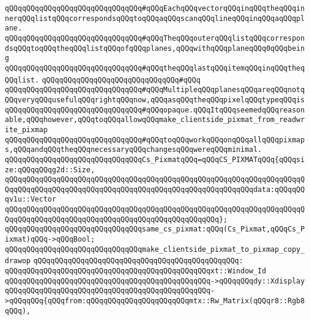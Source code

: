\verb|qQQqqQQqqQQqqQQqqQQqqQQqqQQqqQQq#qQQqEachqQQqvectorqQQqinqQQqtheqQQqinnerqQQqlistqQQqcorrespondsqQQqtoqQQqaqQQqscanqQQqlineqQQqinqQQqaqQQqplane.|\newline
\verb|qQQqqQQqqQQqqQQqqQQqqQQqqQQqqQQq#qQQqTheqQQqouterqQQqlistqQQqcorrespondsqQQqtoqQQqtheqQQqlistqQQqofqQQqplanes,qQQqwithqQQqplaneqQQq0qQQqbeing|\newline
\verb|qQQqqQQqqQQqqQQqqQQqqQQqqQQqqQQq#qQQqtheqQQqlastqQQqitemqQQqinqQQqtheqQQqlist.|\newline
\verb|qQQqqQQqqQQqqQQqqQQqqQQqqQQqqQQq#qQQq|\newline
\verb|qQQqqQQqqQQqqQQqqQQqqQQqqQQqqQQq#qQQqMultipleqQQqplanesqQQqareqQQqnotqQQqveryqQQqusefulqQQqrightqQQqnow,qQQqasqQQqtheqQQqpixelqQQqtypeqQQqis|\newline
\verb|qQQqqQQqqQQqqQQqqQQqqQQqqQQqqQQq#qQQqopaque.qQQqItqQQqseemedqQQqreasonable,qQQqhowever,qQQqtoqQQqallowqQQqmake_clientside_pixmat_from_readwrite_pixmap|\newline
\verb|qQQqqQQqqQQqqQQqqQQqqQQqqQQqqQQq#qQQqtoqQQqworkqQQqonqQQqallqQQqpixmaps,qQQqandqQQqtheqQQqnecessaryqQQqchangesqQQqwereqQQqminimal.|\newline
\newline
\newline
\verb|qQQqqQQqqQQqqQQqqQQqqQQqqQQqqQQqCs_PixmatqQQq=qQQqCS_PIXMATqQQq{qQQqsize:qQQqqQQqg2d::Size,|\newline
\verb|qQQqqQQqqQQqqQQqqQQqqQQqqQQqqQQqqQQqqQQqqQQqqQQqqQQqqQQqqQQqqQQqqQQqqQQqqQQqqQQqqQQqqQQqqQQqqQQqqQQqqQQqqQQqqQQqqQQqqQQqqQQqqQQqdata:qQQqqQQqv1u::Vector|\newline
\verb|qQQqqQQqqQQqqQQqqQQqqQQqqQQqqQQqqQQqqQQqqQQqqQQqqQQqqQQqqQQqqQQqqQQqqQQqqQQqqQQqqQQqqQQqqQQqqQQqqQQqqQQqqQQqqQQqqQQqqQQq};|\newline
\newline
\verb|qQQqqQQqqQQqqQQqqQQqqQQqqQQqqQQqsame_cs_pixmat:qQQq(Cs_Pixmat,qQQqCs_Pixmat)qQQq->qQQqBool;|\newline
\newline
\verb|qQQqqQQqqQQqqQQqqQQqqQQqqQQqqQQqmake_clientside_pixmat_to_pixmap_copy_drawop|\newline
\verb|qQQqqQQqqQQqqQQqqQQqqQQqqQQqqQQqqQQqqQQqqQQqqQQq:|\newline
\verb|qQQqqQQqqQQqqQQqqQQqqQQqqQQqqQQqqQQqqQQqqQQqqQQqxt::Window_Id|\newline
\verb|qQQqqQQqqQQqqQQqqQQqqQQqqQQqqQQqqQQqqQQqqQQqqQQq->qQQqqQQqdy::Xdisplay|\newline
\verb|qQQqqQQqqQQqqQQqqQQqqQQqqQQqqQQqqQQqqQQqqQQqqQQq->qQQqqQQq{qQQqfrom:qQQqqQQqqQQqqQQqqQQqqQQqmtx::Rw_Matrix(qQQqr8::Rgb8qQQq),|\newline

